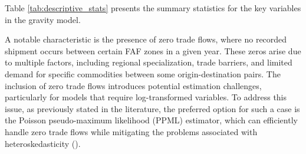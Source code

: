 

Table \ref{tab:descriptive_stats} presents the summary statistics for the key variables in the gravity model. 

A notable characteristic is the presence of zero trade flows, where no recorded shipment occurs between certain FAF zones in a given year. These zeros arise due to multiple factors, including regional specialization, trade barriers, and limited demand for specific commodities between some origin-destination pairs. The inclusion of zero trade flows introduces potential estimation challenges, particularly for models that require log-transformed variables. To address this issue, as previously stated in the literature, the preferred option for such a case is the Poisson pseudo-maximum likelihood (PPML) estimator, which can efficiently handle zero trade flows while mitigating the problems associated with heteroskedasticity (\textcite{silva2006log}).



